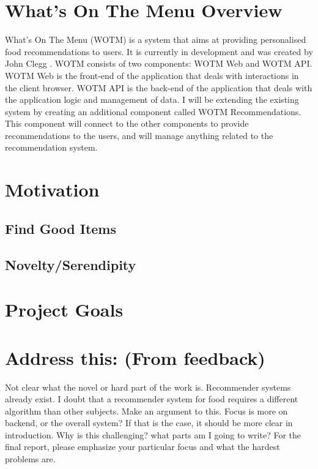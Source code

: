 

\section{What's On The Menu Overview}

What's On The Menu (WOTM) is a system that aims at providing personalised food recommendations to users. It is currently in development and was created by John Clegg . WOTM consists of two components: WOTM Web and WOTM API. WOTM Web is the front-end of the application that deals with interactions in the client browser. WOTM API is the back-end of the application that deals with the application logic and management of data. I will be extending the existing system by creating an additional component called WOTM Recommendations. This component will connect to the other components to provide recommendations to the users, and will manage anything related to the recommendation system. 

\section{Motivation}
\subsection{Find Good Items}
\subsection{Novelty/Serendipity}
\section{Project Goals}
\subsection{}
\subsection{}
\subsection{}
\subsection{}


\section{Address this: (From feedback)}
Not clear what the novel or hard part of the work is. Recommender systems already exist. I doubt that a recommender system for food requires a different algorithm than other subjects. Make an argument to this.
Focus is more on backend, or the overall system? If that is the case, it should be more clear in introduction. Why is this challenging? 
what parts am I going to write?
For the final report, please emphasize your particular focus and what the hardest problems are. 